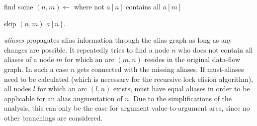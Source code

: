 \begin{algorithmic}
 
  \State {} 
\EndFor
\Repeat
\State find some $(n, m) \gets$  where not $a[n]$ contains all $a[m]$

  \State skip $(n, m)$
\Else
  \State $a[n]$.
\EndIf

\EndFunction
\end{algorithmic}
\textit{aliases} propagates alias information through the alias graph as long as any changes are possible. It repeatedly tries to find a node $n$ who does not contain all aliases of a node $m$ for which an arc $(m, n)$ resides in the original data-flow graph. In such a case $n$ gets connected with the missing aliases. If must-aliases need to be calculated (which is necessary for the recursive-lock elision algorithm), all nodes $l$ for which an arc $(l, n)$ exists, must have equal aliases in order to be applicable for an alias augmentation of $n$. Due to the simplifications of the analysis, this can only be the case for argument value-to-argument arcs, since no other branchings are considered. 

